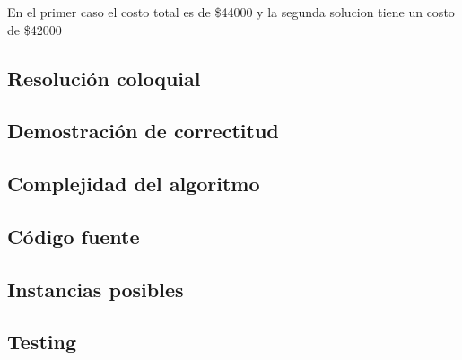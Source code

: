 En el primer caso el costo total es de \$44000 y la segunda solucion tiene un costo de \$42000

\subsection{Resolución coloquial}

\subsection{Demostración de correctitud}

\subsection{Complejidad del algoritmo}

\subsection{Código fuente}

\subsection{Instancias posibles}

\subsection{Testing}
